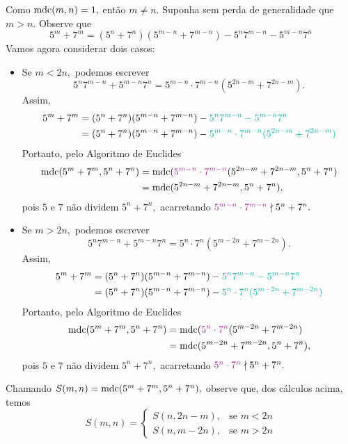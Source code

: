\documentclass[12pt, a4paper]{article}
\newcommand{\mdc}{{\rm mdc}}
\begin{document}
\begin{solution}
Como $\mdc(m,n) = 1,$ então $m \neq n.$ Suponha sem perda de generalidade que $m > n.$ Observe que
\[
5^m + 7^m = (5^n + 7^n)(5^{m-n} + 7^{m-n}) - 5^n 7^{m-n} - 5^{m-n}7^n
\]
Vamos agora considerar dois casos:
\begin{itemize}
    \item Se $m < 2n,$ podemos escrever
    \[
    5^n 7^{m-n} + 5^{m-n}7^n = 5^{m-n} \cdot 7^{m-n} (5^{2n-m} + 7^{2n-m}).
    \]
    Assim,
\begin{align*}
5^m + 7^m &= (5^n + 7^n)(5^{m-n} + 7^{m-n}) - \textcolor{Emerald}{5^n 7^{m-n} - 5^{m-n}7^n} \\&= (5^n + 7^n)(5^{m-n} + 7^{m-n}) - \textcolor{Emerald}{5^{m-n} \cdot 7^{m-n} (5^{2n-m} + 7^{2n-m})}
\end{align*}
Portanto, pelo Algoritmo de Euclides
\begin{align*}
    \mdc(5^m + 7^m, 5^n + 7^n) &= \mdc(\textcolor{Mulberry}{5^{m-n} \cdot 7^{m-n}} (5^{2n-m} + 7^{2n-m}, 5^n + 7^n) \\&= \mdc( 5^{2n-m} + 7^{2n-m},5^n + 7^n),
\end{align*}
pois $5$ e $7$ não dividem $5^n + 7^n,$ acarretando $\textcolor{Mulberry}{5^{m-n} \cdot 7^{m-n}} \nmid 5^n + 7^n.$ 
    \item Se $m > 2n,$ podemos escrever
    \[ 5^n 7^{m-n} + 5^{m-n}7^n = 5^{n} \cdot 7^{n} (5^{m-2n} + 7^{m-2n}).\]
    Assim,
\begin{align*}
5^m + 7^m &= (5^n + 7^n)(5^{m-n} + 7^{m-n}) - \textcolor{Emerald}{5^n 7^{m-n} - 5^{m-n}7^n} \\&= (5^n + 7^n)(5^{m-n} + 7^{m-n}) - \textcolor{Emerald}{5^{n} \cdot 7^{n} (5^{m-2n} + 7^{m-2n})}
\end{align*}
Portanto, pelo Algoritmo de Euclides
\begin{align*}
    \mdc(5^m + 7^m, 5^n + 7^n) &= \mdc(\textcolor{Mulberry}{5^{n} \cdot 7^{n}} (5^{m-2n} + 7^{m-2n}) \\&= \mdc( 5^{m-2n} + 7^{m-2n},5^n + 7^n),
\end{align*}
pois $5$ e $7$ não dividem $5^n + 7^n,$ acarretando $\textcolor{Mulberry}{5^{n} \cdot 7^{n}} \nmid 5^n + 7^n.$ 
\end{itemize}

Chamando $S(m,n)  = \mdc(5^m + 7^m, 5^n + 7^n),$ observe que, dos cálculos acima, temos
\begin{equation}\label{S}
S(m,n) = \begin{cases}
S(n,2n-m), & \mbox{se } m < 2n \\
S(n,m-2n), & \mbox{se } m > 2n
\end{cases}
\end{equation}


\end{solution}
\end{document}

